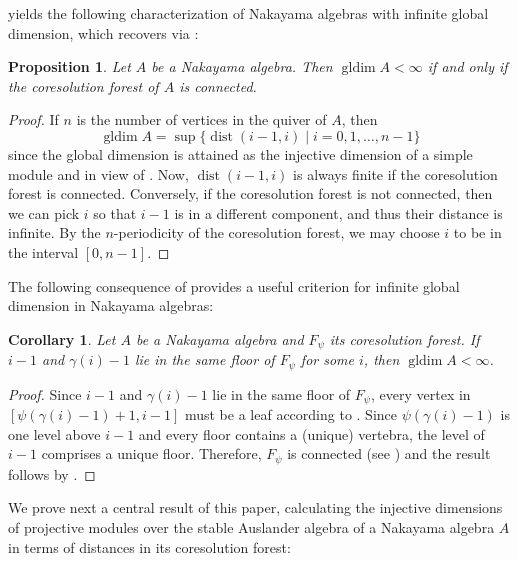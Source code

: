 \documentclass[a4paper]{amsart}
\newtheorem{corollary}[theorem]{Corollary}
\newtheorem{proposition}[theorem]{Proposition}
\theoremstyle{definition}
\theoremstyle{remark}
\numberwithin{equation}{theorem}
\newcommand{\gldim}{\operatorname{gldim}}
\newcommand{\dist}{\operatorname{dist}}
\newcommand{\psiforest}{F_\psi}
\begin{document}
 yields the following characterization of Nakayama algebras with infinite global dimension, which recovers \cite[Proposition 1.1]{S2} via :
\begin{proposition}\label{lemma:infinitegldim}
    Let $A$ be a Nakayama algebra.
    Then $\gldim A < \infty$ if and only if the coresolution forest of $ A $ is connected.
\end{proposition}
\begin{proof}
  If $ n $ is the number of vertices in the quiver of $ A $, then
        \[
            \gldim A = \sup \bigl\{ \dist(i-1,i) \mid i = 0 ,1 ,\ldots , n-1 \bigr\}
        \]
  since the global dimension is attained as the injective dimension of a simple module and in view of .
  Now, $\dist(i - 1, i)$ is always finite if the coresolution forest is connected.
  Conversely, if the coresolution forest is not connected, then we can pick $i$ so that $i-1$ is in a different component, and thus their distance is infinite.
  By the $ n $-periodicity of the coresolution forest, we may choose $ i $ to be in the interval $ [ 0 , n-1 ] $.
\end{proof}


The following consequence of  provides a useful criterion for infinite global dimension in Nakayama algebras:


\begin{corollary}\label{cor:finite.gldim}
   Let $ A $ be a Nakayama algebra and $ \psiforest $ its coresolution forest. If $ i-1 $ and $ \gamma(i)-1 $ lie in the same floor of $ \psiforest $ for some $ i $, then $ \gldim A < \infty $.
\end{corollary}

\begin{proof}
    Since $ i-1 $ and $ \gamma(i)-1 $ lie in the same floor of $ \psiforest $, every vertex in $ [ \psi (\gamma(i)-1)+1 , i-1 ] $ must be a leaf according to . Since $ \psi(\gamma(i)-1) $ is one level above $ i-1 $ and every floor contains a (unique) vertebra, the level of $ i-1 $ comprises a unique floor. Therefore, $ \psiforest $ is connected (see ) and the result follows by .
\end{proof}


We prove next a central result of this paper, calculating the injective dimensions of projective modules over the stable Auslander algebra of a Nakayama algebra $ A $ in terms of distances in its coresolution forest:
\end{document}
